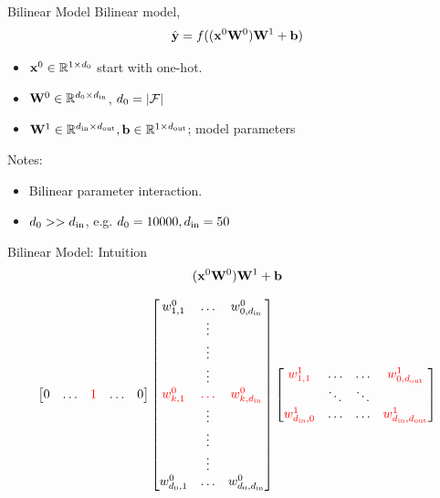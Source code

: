 \documentclass{beamer}
\begin{document}
\begin{frame}{Bilinear Model}
  Bilinear model,
  \[\hat{\mathbf{y}} = f((\mathbf{x}^0 \mathbf{W}^0)\mathbf{W}^1 + \mathbf{b})\]
  \begin{itemize}
  \item $\mathbf{x}^0 \in \mathbb{R}^{1 \times d_0}$ start with one-hot.
  \item $\mathbf{W}^0 \in \mathbb{R}^{d_0 \times {d_{\mathrm{in}}}}$, $d_0 = |\mathcal{F}|$
  \item $\mathbf{W}^1 \in \mathbb{R}^{{d_{\mathrm{in}}} \times {d_{\mathrm{out}}}}, \mathbf{b} \in \mathbb{R}^{1 \times {d_{\mathrm{out}}}}$; model parameters
  \end{itemize}
  \air
  Notes:
  \begin{itemize}
  \item Bilinear parameter interaction.
  \item $d_0 >> {d_{\mathrm{in}}}$, e.g. $d_0 = 10000, {d_{\mathrm{in}}} = 50$
  \end{itemize}

\end{frame}

\begin{frame}{Bilinear Model: Intuition}
  \[ (\mathbf{x}^0 \mathbf{W}^0)\mathbf{W}^1 + \mathbf{b}\]

  \[
    \begin{bmatrix}
      0 & \ldots & \textcolor{red}{1} & \ldots & 0 \\
    \end{bmatrix}
    \begin{bmatrix}
      w^0_{1,1} &  \ldots &w^0_{0, {d_{\mathrm{in}}}}\\
      & \vdots & \\
      & \vdots & \\
      & \vdots & \\
      \textcolor{red}{w^0_{k,1}} &  \textcolor{red}{\ldots} &\textcolor{red}{w^0_{k,{d_{\mathrm{in}}}}}\\
      & \vdots & \\
      & \vdots & \\
      & \vdots & \\
      w^0_{d_0, 1} &  \ldots &w^0_{d_0, {d_{\mathrm{in}}}}\\
    \end{bmatrix}
    \begin{bmatrix}
      \textcolor{red}{w^1_{1,1}} &  \ldots & \ldots &   \textcolor{red}{w^1_{0, {d_{\mathrm{out}}}}}\\
      & \ddots & \ddots &  \\
      \textcolor{red}{w^1_{{d_{\mathrm{in}}},0}} &  \ldots & \ldots & \textcolor{red}{w^1_{{d_{\mathrm{in}}}, {d_{\mathrm{out}}}}}\\
    \end{bmatrix}
  \]

\end{frame}
\end{document}
